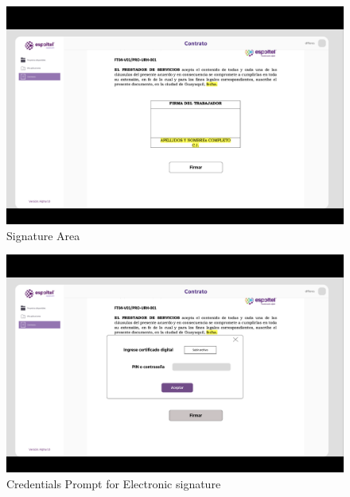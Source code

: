\documentclass{scrreprt}
\begin{document}
\begin{figure}[H]
    
    \centering \small
    \includegraphics[width=1\textwidth]{WebPrototype/Projectsflow7.png}
    \caption{Signature Area}
\end{figure} 

\begin{figure}[H]
    
    \centering \small
    \includegraphics[width=1\textwidth]{WebPrototype/Projectsflow8.png}
    \caption{Credentials Prompt for Electronic signature}
\end{figure} 
\end{document}
